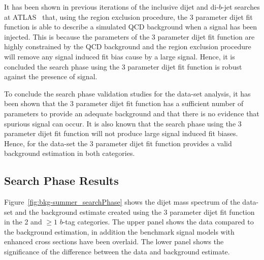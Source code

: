 It has been shown in previous iterations of the inclusive dijet and di-$b$-jet searches at ATLAS~\cite{dijet-mori16_paper,dibjet-mori16_paper} that,
using the region exclusion procedure, the 3 parameter dijet fit function is able to describe a simulated QCD background when a signal has been injected.
This is because the parameters of the 3 parameter dijet fit function are highly constrained by the QCD background
and the region exclusion procedure will remove any signal induced fit bias cause by a large signal.
Hence, it is concluded the search phase using the 3 parameter dijet fit function is robust against the presence of signal.

\FloatBarrier

To conclude the search phase validation studies for the \summer{} data-set analysis,
it has been shown that the 3 parameter dijet fit function has a
sufficient number of parameters to provide an adequate background
and that there is no evidence that spurious signal can occur.
It is also known that the search phase using the 3 parameter dijet fit function
will not produce large signal induced fit biases.
Hence, for the \summer{} data-set the 3 parameter dijet fit function
provides a valid background estimation in both categories.


\clearpage

\subsection{Search Phase Results}
\label{sec:bkg-summer_results}

Figure~\ref{fig:bkg-summer_searchPhase} shows the dijet mass spectrum of the
\summer{} data-set and the background estimate created using the 3 parameter dijet fit function
in the 2 and $\geq1$ $b$-tag categories.
The upper panel shows the data compared to the background estimation,
in addition the benchmark signal models with enhanced cross sections have been overlaid.
The lower panel shows the significance of the difference between the data and background estimate.


